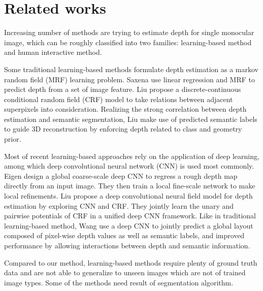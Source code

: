 \documentclass[10pt,twocolumn,letterpaper]{article}
\begin{document}
\section{Related works}

Increasing number of methods are trying to estimate depth for single monocular image, which can be roughly classified into two families: learning-based method and human interactive method.

Some traditional learning-based methods formulate depth estimation as a markov random field (MRF) learning problem. Saxena \etal \cite{NIPS2005_2921} use linear regression and MRF to predict depth from a set of image feature. Liu \etal \cite{Liu_2014_CVPR} propose a discrete-continuous conditional random field (CRF) model to take relations between adjacent superpixels into consideration. Realizing the strong correlation between depth estimation and semantic segmentation, Liu \etal \cite{Liu+al:CVPR10} make use of predicted semantic labels to guide 3D reconstruction by enforcing depth related to class and geometry prior.

Most of recent learning-based approaches rely on the application of deep learning, among which deep convolutional neural network (CNN) is used most commonly. Eigen \etal \cite{DBLP:journals/corr/EigenPF14} design a global coarse-scale deep CNN to regress a rough depth map directly from an input image. They then train a local fine-scale network to make local refinements. Liu \etal \cite{Liu_2015_CVPR} propose a deep convolutional neural field model for depth estimation by exploring CNN and  CRF. They jointly learn the unary and pairwise potentials of CRF in a unified deep CNN framework. Like in traditional learning-based method, Wang \etal \cite{Wang_2015_CVPR} use a deep CNN to jointly predict a global layout composed of pixel-wise depth values as well as semantic labels, and improved performance by allowing interactions between depth and semantic information. 

Compared to our method, learning-based methods require plenty of ground truth data and are not able to generalize to unseen images which are not of trained image types. Some of the methods \cite{Liu+al:CVPR10, Wang_2015_CVPR} need result of segmentation algorithm.
\end{document}
